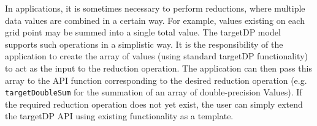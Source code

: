 In applications, it is sometimes necessary to perform reductions,
where multiple data values are combined in a certain way. For example,
values existing on each grid point may be summed into a single total
value. The targetDP model supports such operations in a simplistic
way. It is the responsibility of the application to create the array
of values (using standard targetDP functionality) to act as the input
to the reduction operation. The application can then pass this array
to the API function corresponding to the desired reduction operation
(e.g. \verb+targetDoubleSum+ for the summation of an array of
double-precision Values). If the required reduction operation does not yet
exist, the user can simply extend the targetDP API using existing
functionality as a template.
